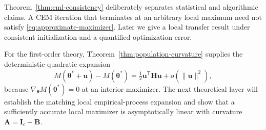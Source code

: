 Theorem~\ref{thm:cml-consistency} deliberately separates statistical and
algorithmic claims.  A CEM iteration that terminates at an arbitrary local
maximum need not satisfy \eqref{eq:approximate-maximizer}.  Later we give a
local transfer result under consistent initialization and a quantified
optimization error.

For the first-order theory, Theorem~\ref{thm:population-curvature} supplies the
deterministic quadratic expansion
\begin{equation}
 M(\boldsymbol{\theta}^*+\mathbf{u})-M(\boldsymbol{\theta}^*)
 =\tfrac12\mathbf{u}^\mathsf T\mathbf H\mathbf{u}+o(\|\mathbf{u}\|^2),
 \label{eq:population-quadratic-expansion}
\end{equation}
because $\nabla_{\boldsymbol{\theta}}M(\boldsymbol{\theta}^*)=0$ at an interior maximizer.  The next theoretical
layer will establish the matching local empirical-process expansion and show
that a sufficiently accurate local maximizer is asymptotically linear with
curvature $\mathbf{A}=\mathbf{I}_c-\mathbf{B}$.
